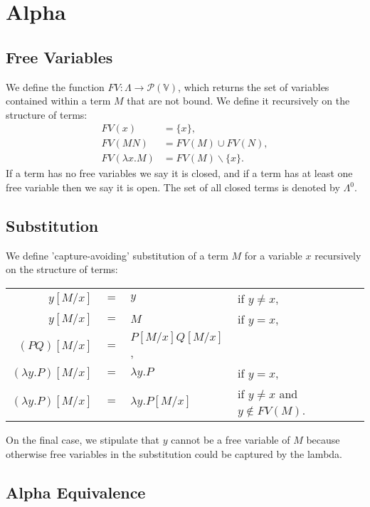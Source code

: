 \section{Alpha}

\subsection{Free Variables}

We define the function $FV : \Lambda \to \mathcal{P}(\mathbb{V})$,
which returns the set of variables contained within a term $M$ that
are not bound. We define it recursively on the structure of terms: 
\begin{align*}
    FV(x) &= \{x\}, \\
    FV(MN) &= FV(M) \cup FV(N), \\
    FV(\lambda x.M) &= FV(M) \backslash \{x\}.
\end{align*} If a term has no free variables we say it is closed,
and if a term has at least one free variable then we say it is open.
The set of all closed terms is denoted by $\Lambda^0$.

\subsection{Substitution}

We define 'capture-avoiding' substitution of a term $M$ for a variable $x$
recursively on the structure of terms: \begin{center}
    \begin{tabular}{ r c l l }
        $y[M/x]$             & $=$ & $y$                        & if $y \neq x$, \\
        $y[M/x]$             & $=$ & $M$                        & if $y = x$, \\
        $(PQ)[M/x]$          & $=$ & $P[M/x] Q[M/x]$, & \\
        $(\lambda y.P)[M/x]$ & $=$ & $\lambda y.P$              & if $y = x$, \\
        $(\lambda y.P)[M/x]$ & $=$ & $\lambda y.P[M/x]$         & if $y \neq x$ and $y \notin FV(M)$.
    \end{tabular} 
\end{center} On the final case, we stipulate that $y$ cannot be a free variable of
$M$ because otherwise free variables in the substitution could be captured by
the lambda.

\subsection{Alpha Equivalence}

